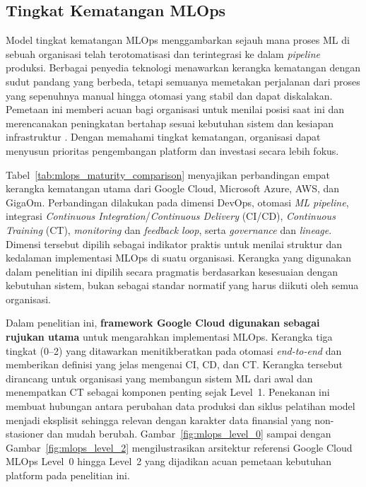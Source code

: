 \subsection{Tingkat Kematangan MLOps}

Model tingkat kematangan MLOps menggambarkan sejauh mana proses ML di sebuah organisasi telah terotomatisasi dan terintegrasi ke dalam \textit{pipeline} produksi. Berbagai penyedia teknologi menawarkan kerangka kematangan dengan sudut pandang yang berbeda, tetapi semuanya memetakan perjalanan dari proses yang sepenuhnya manual hingga otomasi yang stabil dan dapat diskalakan. Pemetaan ini memberi acuan bagi organisasi untuk menilai posisi saat ini dan merencanakan peningkatan bertahap sesuai kebutuhan sistem dan kesiapan infrastruktur \autocite{googlecloud2024mlops,azure2023maturity,kartakis2022aws,mcknight2020gigaom}. Dengan memahami tingkat kematangan, organisasi dapat menyusun prioritas pengembangan platform dan investasi secara lebih fokus.

Tabel~\ref{tab:mlops_maturity_comparison} menyajikan perbandingan empat kerangka kematangan utama dari Google Cloud, Microsoft Azure, AWS, dan GigaOm. Perbandingan dilakukan pada dimensi DevOps, otomasi \textit{ML pipeline}, integrasi \textit{Continuous Integration}/\textit{Continuous Delivery} (CI/CD), \textit{Continuous Training} (CT), \textit{monitoring} dan \textit{feedback loop}, serta \textit{governance} dan \textit{lineage}. Dimensi tersebut dipilih sebagai indikator praktis untuk menilai struktur dan kedalaman implementasi MLOps di suatu organisasi. Kerangka yang digunakan dalam penelitian ini dipilih secara pragmatis berdasarkan kesesuaian dengan kebutuhan sistem, bukan sebagai standar normatif yang harus diikuti oleh semua organisasi.



Dalam penelitian ini, \textbf{framework Google Cloud digunakan sebagai rujukan utama} untuk mengarahkan implementasi MLOps. Kerangka tiga tingkat (0--2) yang ditawarkan menitikberatkan pada otomasi \textit{end-to-end} dan memberikan definisi yang jelas mengenai CI, CD, dan CT. Kerangka tersebut dirancang untuk organisasi yang membangun sistem ML dari awal dan menempatkan CT sebagai komponen penting sejak Level~1. Penekanan ini membuat hubungan antara perubahan data produksi dan siklus pelatihan model menjadi eksplisit sehingga relevan dengan karakter data finansial yang non-stasioner dan mudah berubah. Gambar~\ref{fig:mlops_level_0} sampai dengan Gambar~\ref{fig:mlops_level_2} mengilustrasikan arsitektur referensi Google Cloud MLOps Level~0 hingga Level~2 yang dijadikan acuan pemetaan kebutuhan platform pada penelitian ini.


